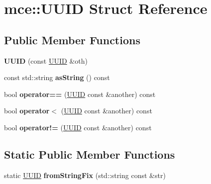 \hypertarget{structmce_1_1_u_u_i_d}{}\section{mce\+::U\+U\+ID Struct Reference}
\label{structmce_1_1_u_u_i_d}
\subsection*{Public Member Functions}
\begin{DoxyCompactItemize}
\item 
\mbox{\label{structmce_1_1_u_u_i_d_a0b753fa8bb7ca5e238ac95fcb716d5f8}} 
{\bfseries U\+U\+ID} (const \mbox{\hyperlink{structmce_1_1_u_u_i_d}{U\+U\+ID}} \&oth)
\item 
\mbox{\label{structmce_1_1_u_u_i_d_ac7694f56e870a01efb4d9592d45280b7}} 
const std\+::string {\bfseries as\+String} () const
\item 
\mbox{\label{structmce_1_1_u_u_i_d_a41a825c4aabfd9823e2fcd3371ca4f61}} 
bool {\bfseries operator==} (\mbox{\hyperlink{structmce_1_1_u_u_i_d}{U\+U\+ID}} const \&another) const
\item 
\mbox{\label{structmce_1_1_u_u_i_d_ac8316f072f7a9da67589547f857de16a}} 
bool {\bfseries operator$<$} (\mbox{\hyperlink{structmce_1_1_u_u_i_d}{U\+U\+ID}} const \&another) const
\item 
\mbox{\label{structmce_1_1_u_u_i_d_af54091a789b267f4ebe1602f7f90b9e0}} 
bool {\bfseries operator!=} (\mbox{\hyperlink{structmce_1_1_u_u_i_d}{U\+U\+ID}} const \&another) const
\end{DoxyCompactItemize}
\subsection*{Static Public Member Functions}
\begin{DoxyCompactItemize}
\item 
\mbox{\label{structmce_1_1_u_u_i_d_a175b58564548e8555ea8c8eed1b153f8}} 
static \mbox{\hyperlink{structmce_1_1_u_u_i_d}{U\+U\+ID}} {\bfseries from\+String\+Fix} (std\+::string const \&str)
\end{DoxyCompactItemize}
